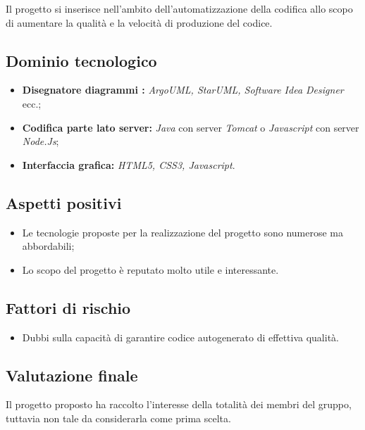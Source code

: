 \documentclass[openany,12pt,a4paper]{report}
\begin{document}
	Il progetto si inserisce nell'ambito dell'automatizzazione della codifica allo scopo di aumentare la qualità e la velocità di produzione del codice.

	\subsection{Dominio tecnologico}

	\begin{itemize}
		\item \textbf{Disegnatore diagrammi :} \textit{ArgoUML, StarUML, Software Idea Designer} ecc.;

		\item \textbf{Codifica parte lato server:} \textit{Java} con server \textit{Tomcat} o \textit{Javascript} con server \textit{Node.Js};

		\item \textbf{Interfaccia grafica:} \textit{HTML5, CSS3, Javascript}.
	\end{itemize}

	\subsection{Aspetti positivi}

	\begin{itemize}
		\item Le tecnologie proposte per la realizzazione del progetto sono numerose ma abbordabili;

		\item Lo scopo del progetto è reputato molto utile e interessante.
	\end{itemize}

	\subsection{Fattori di rischio}

	\begin{itemize}
		\item Dubbi sulla capacità di garantire codice autogenerato di effettiva qualità.
	\end{itemize}

	\subsection{Valutazione finale}

	Il progetto proposto ha raccolto l'interesse della totalità dei membri del gruppo, tuttavia non tale da considerarla come prima scelta.
\end{document}

